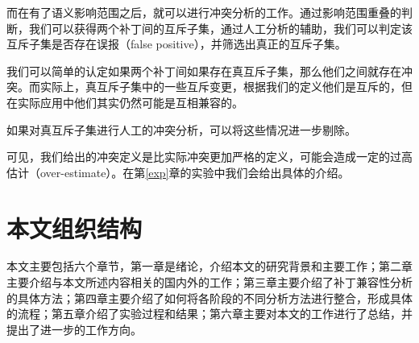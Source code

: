 而在有了语义影响范围之后，就可以进行冲突分析的工作。通过影响范围重叠的判断，我们可以获得两个补丁间的互斥子集，通过人工分析的辅助，我们可以判定该互斥子集是否存在误报（false positive），并筛选出真正的互斥子集。

我们可以简单的认定如果两个补丁间如果存在真互斥子集，那么他们之间就存在冲突。而实际上，真互斥子集中的一些互斥变更，根据我们的定义他们是互斥的，但在实际应用中他们其实仍然可能是互相兼容的。

如果对真互斥子集进行人工的冲突分析，可以将这些情况进一步剔除。

可见，我们给出的冲突定义是比实际冲突更加严格的定义，可能会造成一定的过高估计（over-estimate）。在第\ref {exp}章的实验中我们会给出具体的介绍。


\section{本文组织结构}

本文主要包括六个章节，第一章是绪论，介绍本文的研究背景和主要工作；第二章主要介绍与本文所述内容相关的国内外的工作；第三章主要介绍了补丁兼容性分析的具体方法；第四章主要介绍了如何将各阶段的不同分析方法进行整合，形成具体的流程；第五章介绍了实验过程和结果；第六章主要对本文的工作进行了总结，并提出了进一步的工作方向。


